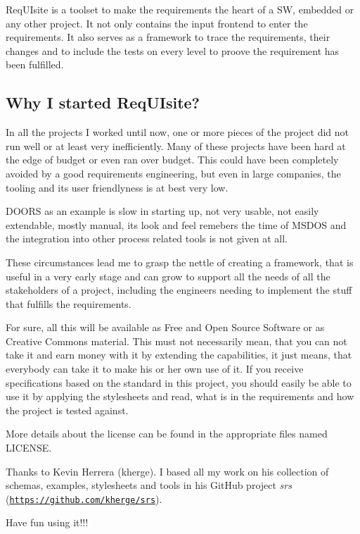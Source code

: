Req\+U\+Isite is a toolset to make the requirements the heart of a SW, embedded or any other project. It not only contains the input frontend to enter the requirements. It also serves as a framework to trace the requirements, their changes and to include the tests on every level to proove the requirement has been fulfilled.

\subsection*{Why I started Req\+U\+Isite?}

In all the projects I worked until now, one or more pieces of the project did not run well or at least very inefficiently. Many of these projects have been hard at the edge of budget or even ran over budget. This could have been completely avoided by a good requirements engineering, but even in large companies, the tooling and it\textquotesingle{}s user friendlyness is at best very low.

D\+O\+O\+RS as an example is slow in starting up, not very usable, not easily extendable, mostly manual, it\textquotesingle{}s look and feel remebers the time of M\+S\+D\+OS and the integration into other process related tools is not given at all.

These circumstances lead me to grasp the nettle of creating a framework, that is useful in a very early stage and can grow to support all the needs of all the stakeholders of a project, including the engineers needing to implement the stuff that fulfills the requirements.

For sure, all this will be available as Free and Open Source Software or as Creative Commons material. This must not necessarily mean, that you can not take it and earn money with it by extending the capabilities, it just means, that everybody can take it to make his or her own use of it. If you receive specifications based on the standard in this project, you should easily be able to use it by applying the stylesheets and read, what is in the requirements and how the project is tested against.

More details about the license can be found in the appropriate files named L\+I\+C\+E\+N\+SE.

Thanks to Kevin Herrera (kherge). I based all my work on his collection of schemas, examples, stylesheets and tools in his Git\+Hub project {\itshape srs} (\href{https://github.com/kherge/srs}{\tt https\+://github.\+com/kherge/srs}).

Have fun using it!!!

